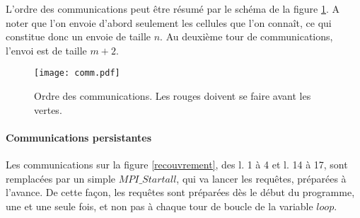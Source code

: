 L'ordre des communications peut être résumé par le schéma de la figure \ref{fig:comm}. A noter que l'on envoie d'abord seulement les cellules que l'on connaît, ce qui constitue donc un envoie de taille $n$. Au deuxième tour de communications, l'envoi est de taille $m+2$.

\begin{figure}[!ht]
\centering
\texttt{[image: comm.pdf]}
\caption{Ordre des communications. Les rouges doivent se faire avant les vertes.}
\label{fig:comm}
\end{figure}

\paragraph{Communications persistantes}
Les communications sur la figure \ref{recouvrement}, des l. 1 à 4 et l. 14 à 17, sont remplacées par un simple $MPI\_Startall$, qui va lancer les requêtes, préparées à l'avance. De cette façon, les requêtes sont préparées dès le début du programme, une et une seule fois, et non pas à chaque tour de boucle de la variable $loop$. 